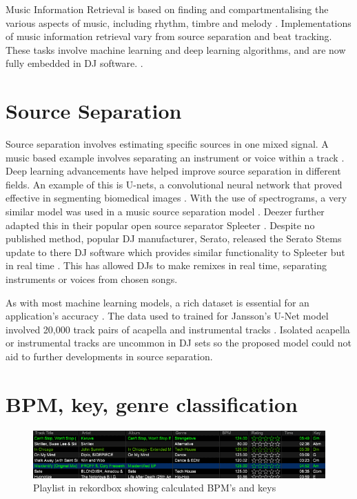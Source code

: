 Music Information Retrieval is based on finding and compartmentalising the various aspects of music, including rhythm, timbre and melody \citep{orio_music_2006}. Implementations of music information retrieval vary from source separation and beat tracking. These tasks involve machine learning and deep learning algorithms, and are now fully embedded in DJ software. \citep{rekordbox_rekordbox_2020}. 

\section{Source Separation}

Source separation involves estimating specific sources in one mixed signal. A music based example involves separating an instrument or voice within a track \citep{sgouros_efficient_2022}. Deep learning advancements have helped improve source separation in different fields. An example of this is U-nets, a convolutional neural network that proved effective in segmenting biomedical images \citep{ronneberger_u-net_2015}. With the use of spectrograms, a very similar model was used in a music source separation model \citep{jansson_singing_2017}. Deezer  further adapted this in their popular open source separator Spleeter \citep{hennequin_spleeter_2020}. Despite no published method, popular DJ manufacturer, Serato, released the Serato Stems update to there DJ software which provides similar functionality to Spleeter but in real time \citep{kirn_review_2023}. This has allowed DJs to make remixes in real time, separating instruments or voices from chosen songs.

As with most machine learning models, a rich dataset is essential for an application's accuracy \citep{jain_overview_2020}. The data used to trained for Jansson's U-Net model involved 20,000 track pairs of acapella and instrumental tracks \citep{jansson_singing_2017}. Isolated acapella or instrumental tracks are uncommon in DJ sets so the proposed model could not aid to further developments in source separation.


\section{BPM, key, genre classification}

\begin{figure}[H]
	
	\includegraphics[scale=0.64]{images/rekordbox}
	\centering
	\caption{Playlist in rekordbox showing calculated BPM's and keys \citep{rekordbox_rekordbox_2023}} 
\end{figure}



